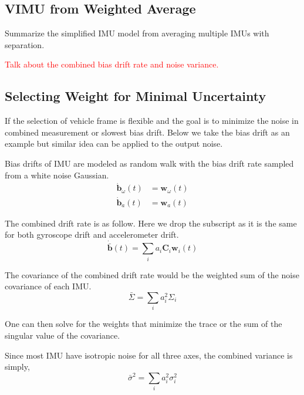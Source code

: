 \documentclass[conference]{IEEEtran}
\begin{document}
\subsection{VIMU from Weighted Average}\label{AA}

Summarize the simplified IMU model from averaging multiple IMUs with separation.

\textcolor{red}{Talk about the combined bias drift rate and noise variance.}

\subsection{Selecting Weight for Minimal Uncertainty}\label{solve_weight_by_noise}

If the selection of vehicle frame is flexible and the goal is to minimize the noise in combined measurement or slowest bias drift. Below we take the bias drift as an example but similar idea can be applied to the output noise.

Bias drifts of IMU are modeled as random walk with the bias drift rate sampled from a white noise Gaussian.
\begin{equation}
\begin{split}
    \dot{\textbf{b}}_\omega(t) &= \textbf{w}_\omega(t) \\
    \dot{\textbf{b}}_a(t) &= \textbf{w}_a(t)
\end{split}
\end{equation}

The combined drift rate is as follow. Here we drop the subscript as it is the same for both gyroscope drift and accelerometer drift.
\begin{equation}
    \dot{\bar{\textbf{b}}}(t) = \sum_i{a_i \textbf{C}_i \textbf{w}_i(t)}
\end{equation}

The covariance of the combined drift rate would be the weighted sum of the noise covariance of each IMU.
\begin{equation}
    \bar{\Sigma} = \sum_i{a_i^2 \Sigma_i}
\end{equation}

One can then solve for the weights that minimize the trace or the sum of the singular value of the covariance.

Since most IMU have isotropic noise for all three axes, the combined variance is simply,
\begin{equation}
    \bar{\sigma}^2 = \sum_i{a_i^2 \sigma_i^2}
\end{equation}
\end{document}
